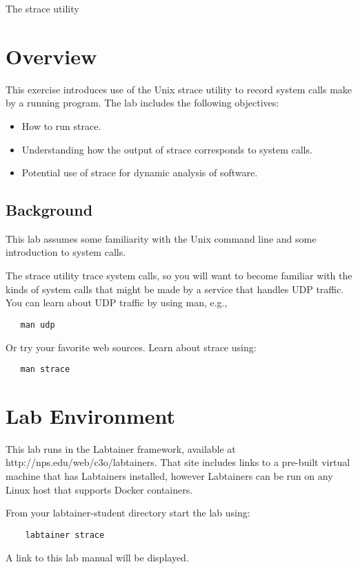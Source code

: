


\begin{center}
{\LARGE The strace utility}
\vspace{0.1in}\\
\end{center}


\section{Overview}
This exercise introduces use of the Unix strace utility to record system
calls make by a running program.
The lab includes the following objectives:
\begin{itemize}
\item How to run strace.
\item Understanding how the output of strace corresponds to system calls.
\item Potential use of strace for dynamic analysis of software.
\end{itemize}

\subsection{Background}
This lab assumes some familiarity with the Unix command line and some introduction to system calls.

The strace utility trace system calls, so you will want to become familiar with the kinds of system
calls that might be made by a service that handles UDP traffic.  You can learn about UDP traffic
by using man, e.g.,
\begin{verbatim}
   man udp
\end{verbatim}
\noindent Or try your favorite web sources.
Learn about strace using:
\begin{verbatim}
   man strace
\end{verbatim}

\section{Lab Environment}
This lab runs in the Labtainer framework,
available at http://nps.edu/web/c3o/labtainers.
That site includes links to a pre-built virtual machine
that has Labtainers installed, however Labtainers can
be run on any Linux host that supports Docker containers.

From your labtainer-student directory start the lab using:
\begin{verbatim}
    labtainer strace
\end{verbatim}
A link to this lab manual will be displayed.

